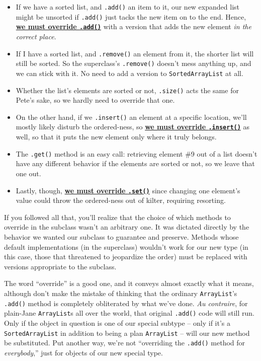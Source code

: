 \begin{itemize}
\itemsep.1em

\item If we have a sorted list, and \texttt{.add()} an item to it, our new
expanded list might be unsorted if \texttt{.add()} just tacks the new item on
to the end. Hence, \underline{\textbf{we must override \texttt{.add()}}} with
a version that adds the new element \textit{in the correct place}.

\item If I have a sorted list, and \texttt{.remove()} an element from it, the
shorter list will still be sorted. So the superclass's \texttt{.remove()}
doesn't mess anything up, and we can stick with it. No need to add a version
to \texttt{SortedArrayList} at all.

\item Whether the list's elements are sorted or not, \texttt{.size()} acts the
same for Pete's sake, so we hardly need to override that one.

\item On the other hand, if we \texttt{.insert()} an element at a specific
location, we'll mostly likely disturb the ordered-ness, so
\underline{\textbf{we must override \texttt{.insert()}}} as well, so that it
puts the new element only where it truly belongs.

\item The \texttt{.get()} method is an easy call: retrieving element \#9 out
of a list doesn't have any different behavior if the elements are sorted or
not, so we leave that one out.

\item Lastly, though, \underline{\textbf{we must override \texttt{.set()}}}
since changing one element's value could throw the ordered-ness out of kilter,
requiring resorting.

\end{itemize}

If you followed all that, you'll realize that the choice of which methods to
override in the subclass wasn't an arbitrary one. It was dictated directly by
the behavior we wanted our subclass to guarantee and preserve. Methods whose
default implementations (in the superclass) wouldn't work for our new type (in
this case, those that threatened to jeopardize the order) must be replaced
with versions appropriate to the subclass.

The word ``override'' is a good one, and it conveys almost exactly what it
means, although don't make the mistake of thinking that the ordinary
\texttt{ArrayList}'s \texttt{.add()} method is completely obliterated by what
we've done. \textit{Au contraire}, for plain-Jane \texttt{ArrayList}s all over
the world, that original \texttt{.add()} code will still run. Only if the
object in question is one of our special subtype -- only if it's a
\texttt{SortedArrayList} in addition to being a plan \texttt{ArrayList} --
will our new method be substituted. Put another way, we're not ``overriding
the \texttt{.add()} method for \textit{everybody},'' just for objects of our
new special type.

